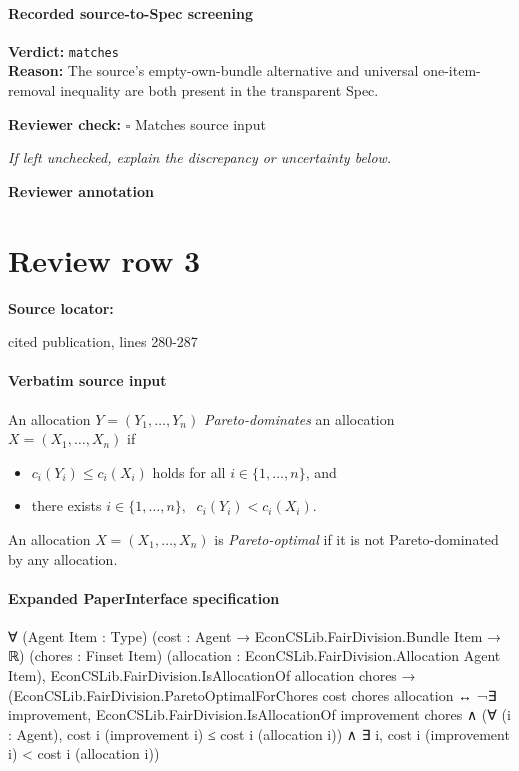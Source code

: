 \documentclass[10pt]{article}
\newcommand{\reviewerbox}{%
  \par\noindent\fbox{\parbox{0.96\linewidth}{\rule{0pt}{0.38in}}}\par
}
\newcommand{\reviewmatch}[1]{%
  \par\noindent\textbf{Reviewer check:} $\square$\; #1\par
  \noindent\emph{If left unchecked, explain the discrepancy or uncertainty below.}\par
}
\begin{document}
\paragraph{Recorded source-to-Spec screening}
\textbf{Verdict:} \texttt{matches}
\\
\textbf{Reason:} The source's empty-own-bundle alternative and universal one-item-removal inequality are both present in the transparent Spec.
\reviewmatch{Matches source input}
\noindent\textbf{Reviewer annotation}\par
\reviewerbox
\clearpage
\hypertarget{source-claim-a1cc8eae6630de31}{}
\section*{Review row 3}
\textbf{Source locator:} {\footnotesize\raggedright cited publication, lines 280-\allowbreak{}287\par}
\paragraph{Verbatim source input}
\begin{ReviewVerbatim}
\begin{definition}
    An allocation $Y=(Y_1,\ldots,Y_n)$ \emph{Pareto-dominates} an allocation $X=(X_1,\ldots,X_n)$ if
    \begin{itemize}
        \item $c_i(Y_i)\leq c_i(X_i)$ holds for all $i\in\{1,\ldots,n\}$, and
        \item there exists $i\in\{1,\ldots,n\},\;$ $c_i(Y_i)<c_i(X_i)$.
    \end{itemize}
    An allocation $X=(X_1,\ldots,X_n)$ is \emph{Pareto-optimal} if it is not Pareto-dominated by any allocation.
\end{definition}
\end{ReviewVerbatim}


\paragraph{Expanded PaperInterface specification}
\begin{ReviewVerbatim}
∀ (Agent Item : Type) (cost : Agent → EconCSLib.FairDivision.Bundle Item → ℝ) (chores : Finset Item)
  (allocation : EconCSLib.FairDivision.Allocation Agent Item),
  EconCSLib.FairDivision.IsAllocationOf allocation chores →
    (EconCSLib.FairDivision.ParetoOptimalForChores cost chores allocation ↔
      ¬∃ improvement,
          EconCSLib.FairDivision.IsAllocationOf improvement chores ∧
            (∀ (i : Agent), cost i (improvement i) ≤ cost i (allocation i)) ∧
              ∃ i, cost i (improvement i) < cost i (allocation i))
\end{ReviewVerbatim}
\end{document}

